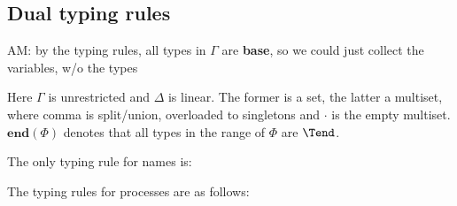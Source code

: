 \subsection{Dual typing rules}
\renewcommand{\Csplit}[2]{#1,  #2}
\renewcommand{\Cupdate}[2]{#1, #2}
\newcommand{\TinV}[2]{{?#1}.#2}
\newcommand{\ToutV}[2]{{!#1}.#2}
\newcommand{\tend}[1]{\mathbf{end}(#1)}

\begin{metanote}
  AM: by the typing rules, all types in $\Gamma$ are \textbf{base}, so we could just collect the variables, w/o the types
\end{metanote}

Here $\Gamma$ is unrestricted and $\Delta$ is linear. The former is a set, the latter a multiset, where comma is split/union, overloaded to singletons and $\cdot$ is the empty multiset.  $\tend \Phi$ denotes that all types in the range of $\Phi$ are $\Tend$.
The only typing rule for names is:
\begin{mathpar}
\end{mathpar}
The typing rules for processes are as follows:
